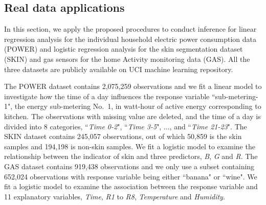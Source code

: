 \documentclass[twoside,11pt]{article}
\begin{document}
\subsection{Real data applications}

In this section, we apply the proposed procedures to conduct inference for linear regression analysis for the individual household electric power consumption data (POWER) and logistic regression analysis for the skin segmentation dataset (SKIN) and gas sensors for the home Activity monitoring data (GAS). All the three datasets are publicly available on UCI machine learning repository.

The POWER dataset contains 2,075,259 observations and we fit a linear model to investigate how the time of a day influences the response variable ``sub-metering-1", the energy sub-metering No.~1, in watt-hour of active energy corresponding to kitchen. The observations with missing value are deleted, and the time of a day is divided into 8 categories, ``{\it Time 0-2}", ``{\it Time 3-5}", ..., and ``{\it Time 21-23}". The SKIN dataset contains 245,057 observations, out of which 50,859 is the skin samples and 194,198 is non-skin samples. We fit a logistic model to examine the relationship between the indicator of skin and three predictors, {\it B}, {\it G} and {\it R}. The GAS dataset contains 919,438 observations and we only use a subset containing 652,024 observations with response variable being either ``banana" or ``wine". We fit a logistic model to examine the association between the response variable and 11 explanatory variables, {\it Time}, {\it R1} to {\it R8}, {\it Temperature} and {\it Humidity}.
\end{document}
